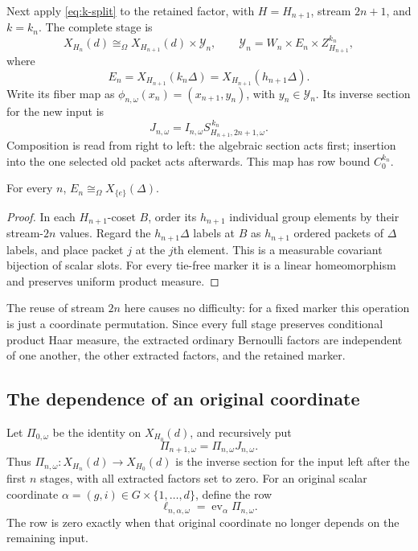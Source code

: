 \documentclass[11pt,a4paper]{article}
\numberwithin{equation}{section}
\newcommand{\reliso}{\mathrel{\cong_{\Omega}}}
\newcommand{\cY}{\mathcal Y}
\newcommand{\ev}{\operatorname{ev}}
\begin{document}
Next apply \eqref{eq:k-split} to the retained factor, with
$H=H_{n+1}$, stream $2n+1$, and $k=k_n$. The complete stage is
\begin{equation}\label{eq:stage}
 X_{H_n}(d)\reliso X_{H_{n+1}}(d)\times\cY_n,
 \qquad
 \cY_n=W_n\times E_n\times Z_{H_{n+1}}^{k_n},
\end{equation}
where
\begin{equation}\label{eq:En}
 E_n=X_{H_{n+1}}(k_n\Delta)
     =X_{H_{n+1}}(h_{n+1}\Delta).
\end{equation}
Write its fiber map as
$\phi_{n,\omega}(x_n)=(x_{n+1},y_n)$, with $y_n\in\cY_n$.
Its inverse section for the new input is
\begin{equation}\label{eq:stage-section}
 J_{n,\omega}
   =I_{n,\omega}S_{H_{n+1},2n+1,\omega}^{\,k_n}.
\end{equation}
Composition is read from right to left: the algebraic section acts
first; insertion into the one selected old packet acts afterwards.
This map has row bound $C_0^{k_n}$.

\begin{lemma}\label{lem:ordinary-output}
For every $n$, $E_n\reliso X_{\{e\}}(\Delta)$.
\end{lemma}
\begin{proof}
In each $H_{n+1}$-coset $B$, order its $h_{n+1}$ individual group
elements by their stream-$2n$ values. Regard the $h_{n+1}\Delta$ labels
at $B$ as $h_{n+1}$ ordered packets of $\Delta$ labels, and place packet
$j$ at the $j$th element. This is a measurable covariant bijection of
scalar slots. For every tie-free marker it is a linear homeomorphism
and preserves uniform product measure.
\end{proof}

The reuse of stream $2n$ here causes no difficulty: for a fixed marker
this operation is just a coordinate permutation. Since every full
stage preserves conditional product Haar measure, the extracted
ordinary Bernoulli factors are independent of one another, the other
extracted factors, and the retained marker.

\subsection{The dependence of an original coordinate}

Let $\Pi_{0,\omega}$ be the identity on $X_{H_0}(d)$, and recursively put
\[
 \Pi_{n+1,\omega}=\Pi_{n,\omega}J_{n,\omega}.
\]
Thus $\Pi_{n,\omega}:X_{H_n}(d)\to X_{H_0}(d)$ is the inverse section
for the input left after the first $n$ stages, with all extracted
factors set to zero. For an original scalar coordinate
$\alpha=(g,i)\in G\times\{1,\ldots,d\}$, define the row
\begin{equation}\label{eq:ell}
 \ell_{n,\alpha,\omega}=\ev_\alpha\Pi_{n,\omega}.
\end{equation}
The row is zero exactly when that original coordinate no longer depends
on the remaining input.
\end{document}
